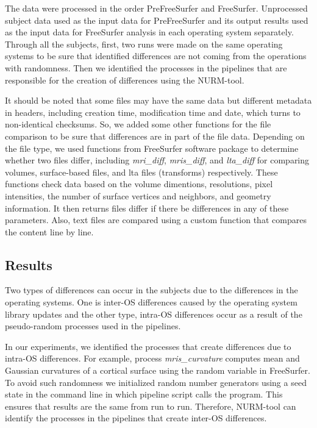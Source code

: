\documentclass[a4paper,num-refs]{oup-contemporary}
\begin{document}
The data were processed in the order PreFreeSurfer and FreeSurfer. 
Unprocessed subject data used as the input data for PreFreeSurfer and its output 
results used as the input data for FreeSurfer analysis in each operating system separately.
Through all the subjects, first, two runs were made on the same operating systems 
to be sure that identified differences are not coming from the operations with randomness.
Then we identified the processes in the pipelines that are responsible for 
the creation of differences using the NURM-tool.

It should be noted that some files may have the same data but 
different metadata in headers, including creation time, modification time and date, 
which turns to non-identical checksums. 
So, we added some other functions for the file comparison to be sure that differences 
are in part of the file data. 
Depending on the file type, we used functions from FreeSurfer software package to determine 
whether two files differ, including  
\emph{mri\_diff}, \emph{mris\_diff}, and \emph{lta\_diff} for comparing volumes, surface-based files, 
and lta files (transforms) respectively. 
These functions check data based on the volume dimentions, 
resolutions, pixel intensities,  
the number of surface vertices and neighbors, and geometry information. 
It then returns files differ if there be differences in any of these parameters.
Also, text files are compared using a custom function that compares the content line by line.

\subsection{Results}

Two types of differences can occur in the subjects due to the 
differences in the operating systems. One is inter-OS differences caused by the 
operating system library updates and the other type, intra-OS differences 
occur as a result of the pseudo-random processes used in the 
pipelines. 

In our experiments, we identified the processes that create differences due to 
intra-OS differences.  
For example, process \emph{mris\_curvature}
computes mean and Gaussian curvatures of a cortical surface using 
the random variable in FreeSurfer.
To avoid such randomness we 
initialized random number generators using a seed state in 
the command line in which pipeline script calls the program.
This ensures that results are the same from run to run.
Therefore, NURM-tool can identify the processes in the pipelines 
that create inter-OS differences. 
\end{document}
